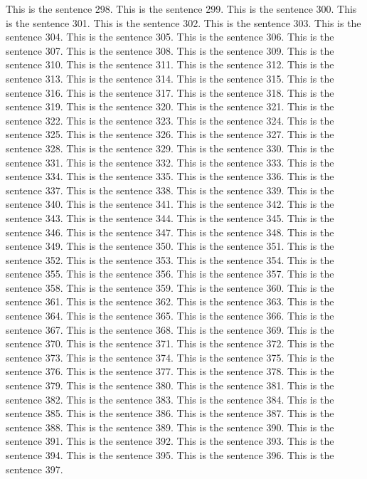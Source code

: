 \documentclass{article}
\begin{document}
This is the sentence 298.
This is the sentence 299.
This is the sentence 300.
This is the sentence 301.
This is the sentence 302.
This is the sentence 303.
This is the sentence 304.
This is the sentence 305.
This is the sentence 306.
This is the sentence 307.
This is the sentence 308.
This is the sentence 309.
This is the sentence 310.
This is the sentence 311.
This is the sentence 312.
This is the sentence 313.
This is the sentence 314.
This is the sentence 315.
This is the sentence 316.
This is the sentence 317.
This is the sentence 318.
This is the sentence 319.
This is the sentence 320.
This is the sentence 321.
This is the sentence 322.
This is the sentence 323.
This is the sentence 324.
This is the sentence 325.
This is the sentence 326.
This is the sentence 327.
This is the sentence 328.
This is the sentence 329.
This is the sentence 330.
This is the sentence 331.
This is the sentence 332.
This is the sentence 333.
This is the sentence 334.
This is the sentence 335.
This is the sentence 336.
This is the sentence 337.
This is the sentence 338.
This is the sentence 339.
This is the sentence 340.
This is the sentence 341.
This is the sentence 342.
This is the sentence 343.
This is the sentence 344.
This is the sentence 345.
This is the sentence 346.
This is the sentence 347.
This is the sentence 348.
This is the sentence 349.
This is the sentence 350.
This is the sentence 351.
This is the sentence 352.
This is the sentence 353.
This is the sentence 354.
This is the sentence 355.
This is the sentence 356.
This is the sentence 357.
This is the sentence 358.
This is the sentence 359.
This is the sentence 360.
This is the sentence 361.
This is the sentence 362.
This is the sentence 363.
This is the sentence 364.
This is the sentence 365.
This is the sentence 366.
This is the sentence 367.
This is the sentence 368.
This is the sentence 369.
This is the sentence 370.
This is the sentence 371.
This is the sentence 372.
This is the sentence 373.
This is the sentence 374.
This is the sentence 375.
This is the sentence 376.
This is the sentence 377.
This is the sentence 378.
This is the sentence 379.
This is the sentence 380.
This is the sentence 381.
This is the sentence 382.
This is the sentence 383.
This is the sentence 384.
This is the sentence 385.
This is the sentence 386.
This is the sentence 387.
This is the sentence 388.
This is the sentence 389.
This is the sentence 390.
This is the sentence 391.
This is the sentence 392.
This is the sentence 393.
This is the sentence 394.
This is the sentence 395.
This is the sentence 396.
This is the sentence 397.
\end{document}
